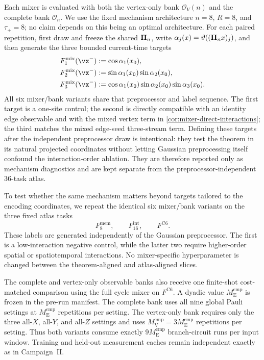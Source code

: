 Each mixer is evaluated with both the vertex-only bank $\mathcal O_V(n)$ and
the complete bank $\mathcal O_n$.  We use the fixed mechanism architecture
$n=8$, $R=8$, and $\tau_+=8$; no claim depends on this being an optimal
architecture.  For each paired repetition, first draw and freeze the shared
$\bm{\Pi}_n$, write
$\alpha_j(x)=\vartheta((\bm{\Pi}_nx)_j)$, and then generate the three
bounded current-time targets
\begin{align}
    F_{1}^{\mathrm{mix}}(\vx^-)
      &:=\cos\alpha_1(x_0),
      \label{eq:app-mixer-task1}\\
    F_{2}^{\mathrm{mix}}(\vx^-)
      &:=\sin\alpha_1(x_0)\sin\alpha_2(x_0),
      \label{eq:app-mixer-task2}\\
    F_{3}^{\mathrm{mix}}(\vx^-)
      &:=\cos\alpha_1(x_0)\sin\alpha_2(x_0)\sin\alpha_3(x_0).
      \label{eq:app-mixer-task3}
\end{align}
All six mixer/bank variants share that preprocessor and label sequence.  The
first target is a one-site control; the second is directly compatible with an
identity edge observable and with the mixed vertex term in
\cref{cor:mixer-direct-interactions}; the third matches the mixed edge-seed
three-stream term.  Defining these targets after the independent preprocessor
draw is intentional: they test the theorem in its natural projected
coordinates without letting Gaussian preprocessing itself confound the
interaction-order ablation.  They are therefore reported only as mechanism
diagnostics and are kept separate from the preprocessor-independent 36-task
atlas.

To test whether the same mechanism matters beyond targets tailored to the
encoding coordinates, we repeat the identical six mixer/bank variants on the
three fixed atlas tasks
\[
    F^{\mathrm{mem}}_8,\qquad
    F^{\mathrm{int}}_{16},\qquad
    F^{\mathrm{C6}}.
\]
These labels are generated independently of the Gaussian preprocessor.  The
first is a low-interaction negative control, while the latter two require
higher-order spatial or spatiotemporal interactions.  No mixer-specific
hyperparameter is changed between the theorem-aligned and atlas-aligned
slices.

The complete and vertex-only observable banks also receive one finite-shot
cost-matched comparison using the full cycle mixer on $F^{\mathrm{C6}}$.  A
dyadic value $M_{\mathrm E}^{\mathrm{cmp}}$ is
frozen in the pre-run manifest.  The complete bank uses all nine global Pauli
settings at $M_{\mathrm E}^{\mathrm{cmp}}$ repetitions per setting.  The
vertex-only bank requires only the three all-$X$, all-$Y$, and all-$Z$ settings
and uses $M_{\mathrm V}^{\mathrm{cmp}}=3M_{\mathrm E}^{\mathrm{cmp}}$
repetitions per setting.  Thus both variants consume exactly
$9M_{\mathrm E}^{\mathrm{cmp}}$ branch-circuit runs per input window.  Training
and held-out measurement caches remain independent exactly as in Campaign~II.

